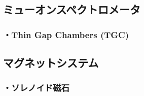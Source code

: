 \subsection{ミューオンスペクトロメータ}
\label{section2-2-4}

\subsubsection{・Thin Gap Chambers (TGC)}



\subsection{マグネットシステム}
\subsubsection{・ソレノイド磁石}




